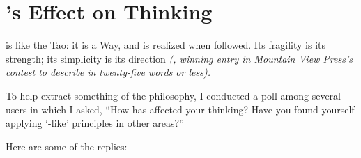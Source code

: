 
\epilog{}
\chapter{%
\Forth{}'s Effect
on Thinking}%

\begin{tfquot}
\Forth{} is like the Tao: it is a Way, and is realized when followed.  Its
fragility is its strength; its simplicity is its direction
\emph{(,
winning entry in Mountain View Press's contest to describe \Forth{}
in twenty-five words or less).}
\end{tfquot}

To help extract something of the \Forth{} philosophy, I conducted a poll
among several \Forth{} users in which I asked, ``How has \Forth{} affected
your thinking?  Have you found yourself applying `\Forth{}-like'
principles in other areas?''

Here are some of the replies:

